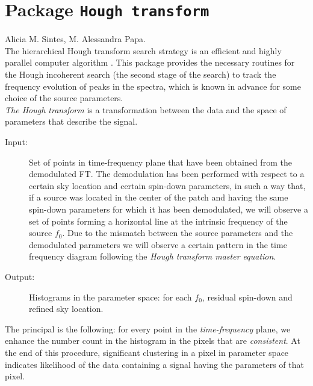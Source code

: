 %  
%
%
%

\chapter{Package \texttt{Hough transform}}


Alicia M. Sintes, M. Alessandra Papa.\\

The  hierarchical Hough transform search strategy is 
an efficient and highly parallel computer algorithm 
\cite{Schutz:1998} \cite{Papa:2001}.
This package provides the necessary routines for the Hough incoherent search
(the second stage of the search) 
  to track the frequency evolution of peaks in the spectra, which
  is known in advance for some choice of the source parameters.\\


{\it The Hough transform} is  a transformation
between the data and the space of parameters that describe the signal.
\begin{description}
\item[ Input:] Set of points in time-frequency plane that have been obtained
from the demodulated FT.
The demodulation  has been performed with respect to a certain sky
location and certain spin-down parameters,
in such a way  that, if a source was located in
the center of the patch and having the same spin-down parameters 
for which it has been
demodulated, we will observe a set of points forming a horizontal 
line at the intrinsic frequency  of the source $f_0$.
 Due to the mismatch between the source  parameters
 and the demodulated parameters we will observe a certain pattern in the time
  frequency diagram following the 
   {\sl Hough transform master equation}.
\item[ Output:] Histograms in the parameter space:
  for each $f_0$, residual spin-down and refined sky location.
\end{description}
The principal is the following: for every point in the {\it  time-frequency}
 plane, we enhance the number count in the 
histogram in the pixels that are {\it consistent}. At the end of this procedure,
significant clustering
 in a pixel in parameter space indicates
 likelihood of the data containing a signal 
having the parameters
of that pixel.
\\

